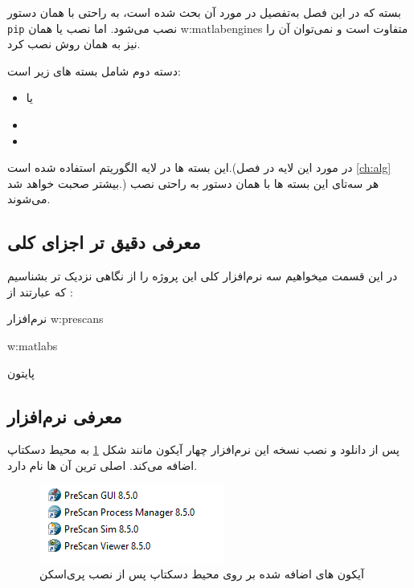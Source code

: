 بسته  که در این فصل به‌تفصیل در مورد آن بحث شده است، به راحتی با همان دستور \texttt{pip} نصب می‌شود. اما نصب 
یا همان
\glspl{w:matlabengine}
متفاوت است و نمی‌توان آن را نیز به همان روش نصب کرد.

دسته دوم شامل بسته های زیر است:
\begin{itemize}
	\item {} یا 
	\item {}
	\item {}
	
\end{itemize}

این بسته ها در لایه الگوریتم استفاده شده است.(در مورد این لایه در فصل 
\ref{ch:alg}
بیشتر صحبت خواهد شد.)
هر سه‌تای این بسته ها با همان دستور  به راحتی نصب می‌شوند.



\subsection{معرفی دقیق تر اجزای کلی}
در این قسمت میخواهیم سه نرم‌افزار کلی این پروژه را از نگاهی نزدیک تر  بشناسیم که عبارتند از :
\begin{enuminline}
	\item 
	نرم‌افزار 
	\glspl{w:prescan}
	\item 
	\glspl{w:matlab}
	\item پایتون
\end{enuminline}

\subsection{معرفی نرم‌افزار 
}

پس از دانلود و نصب نسخه  این نرم‌افزار چهار آیکون مانند شکل 
\ref{fig:prescan-icons}
به محیط دسکتاپ اضافه می‌کند.  اصلی ترین آن ها 
نام دارد.

\begin{figure}[h]
	\centering
	\includegraphics[width=0.4\linewidth]{Figures/prescan-icons}
	\caption{آیکون های اضافه شده بر روی محیط دسکتاپ پس از نصب پری‌اسکن}
	\label{fig:prescan-icons}
\end{figure}

